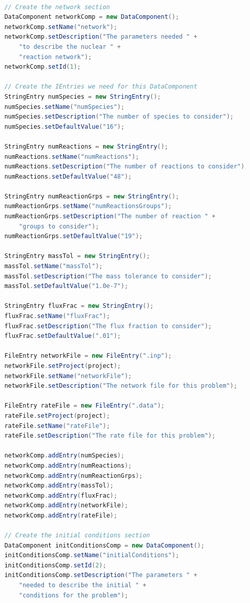 \begin{lstlisting}[language=Java]

    // Create the network section
    DataComponent networkComp = new DataComponent();
    networkComp.setName("network");
    networkComp.setDescription("The parameters needed " +
        "to describe the nuclear " +
    	"reaction network"); 
    networkComp.setId(1);
    
    // Create the IEntries we need for this DataComponent
    StringEntry numSpecies = new StringEntry();
    numSpecies.setName("numSpecies");
    numSpecies.setDescription("The number of species to consider");
    numSpecies.setDefaultValue("16");
    
    StringEntry numReactions = new StringEntry();
    numReactions.setName("numReactions");
    numReactions.setDescription("The number of reactions to consider");
    numReactions.setDefaultValue("48");
    
    StringEntry numReactionGrps = new StringEntry();
    numReactionGrps.setName("numReactionsGroups");
    numReactionGrps.setDescription("The number of reaction " + 
    	"groups to consider"); 
    numReactionGrps.setDefaultValue("19");

    StringEntry massTol = new StringEntry();
    massTol.setName("massTol");
    massTol.setDescription("The mass tolerance to consider");
    massTol.setDefaultValue("1.0e-7");
    
    StringEntry fluxFrac = new StringEntry();
    fluxFrac.setName("fluxFrac");
    fluxFrac.setDescription("The flux fraction to consider");
    fluxFrac.setDefaultValue(".01");
    
    FileEntry networkFile = new FileEntry(".inp");
    networkFile.setProject(project);
    networkFile.setName("networkFile");
    networkFile.setDescription("The network file for this problem");
    
    FileEntry rateFile = new FileEntry(".data");
    rateFile.setProject(project);
    rateFile.setName("rateFile");
    rateFile.setDescription("The rate file for this problem");
    
    networkComp.addEntry(numSpecies);
    networkComp.addEntry(numReactions);
    networkComp.addEntry(numReactionGrps); 
    networkComp.addEntry(massTol);
    networkComp.addEntry(fluxFrac);
    networkComp.addEntry(networkFile);
    networkComp.addEntry(rateFile);
    
    // Create the initial conditions section
    DataComponent initConditionsComp = new DataComponent();
    initConditionsComp.setName("initialConditions");
    initConditionsComp.setId(2);
    initConditionsComp.setDescription("The parameters " +
    	"needed to describe the	initial " + 
    	"conditions for the problem");
    

\end{lstlisting}
